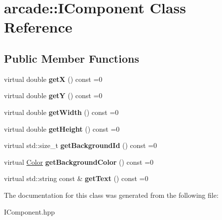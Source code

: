 \hypertarget{classarcade_1_1IComponent}{}\section{arcade\+:\+:I\+Component Class Reference}
\label{classarcade_1_1IComponent}
\subsection*{Public Member Functions}
\begin{DoxyCompactItemize}
\item 
\mbox{\label{classarcade_1_1IComponent_a61139bbc8ad6a1daa4f69cc4a604eb8c}} 
virtual double {\bfseries getX} () const =0
\item 
\mbox{\label{classarcade_1_1IComponent_a6570fa654dcb61447fece948dfa3e69a}} 
virtual double {\bfseries getY} () const =0
\item 
\mbox{\label{classarcade_1_1IComponent_a558e5d49736a3828753a4062d5c9bfb1}} 
virtual double {\bfseries get\+Width} () const =0
\item 
\mbox{\label{classarcade_1_1IComponent_ae1a09a263120185899304b1cbf437116}} 
virtual double {\bfseries get\+Height} () const =0
\item 
\mbox{\label{classarcade_1_1IComponent_a8c44c42832800ea30ff2bd34bd0ed140}} 
virtual std\+::size\+\_\+t {\bfseries get\+Background\+Id} () const =0
\item 
\mbox{\label{classarcade_1_1IComponent_a8c91e73c0efb5047faf810ea4eb1bf33}} 
virtual \hyperlink{unionarcade_1_1Color}{Color} {\bfseries get\+Background\+Color} () const =0
\item 
\mbox{\label{classarcade_1_1IComponent_a67df76de7dbc935e5a61bc4e1abc60de}} 
virtual std\+::string const  \& {\bfseries get\+Text} () const =0
\end{DoxyCompactItemize}


The documentation for this class was generated from the following file\+:\begin{DoxyCompactItemize}
\item 
I\+Component.\+hpp\end{DoxyCompactItemize}
